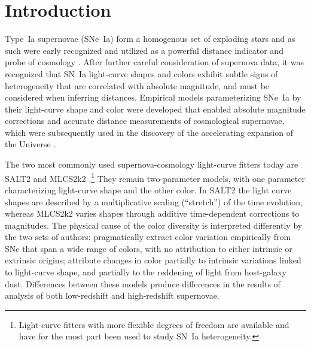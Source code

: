 \documentclass{aastex61}   	%
\begin{document}

\section{Introduction}
Type~Ia supernovae (SNe~Ia) form a homogenous set of exploding stars and as such were early recognized and utilized as a powerful distance indicator 
and probe of cosmology \citep[e.g.][]{1992ARA&A..30..359B, 1993ApJ...415....1S}.  After further careful consideration of supernova data, it was recognized
that SN~Ia light-curve shapes \citep{1993ApJ...413L.105P} and colors \citep{1996ApJ...473...88R, 1998A&A...331..815T} exhibit subtle signs of heterogeneity
that are correlated with absolute magnitude, and must be considered when inferring distances.  Empirical models parameterizing SNe~Ia by their light-curve shape \citep{1996ApJ...473...88R,
1997ApJ...483..565P,
1999ApJ...517..565P}
and color  \citep{1996ApJ...473...88R}  were developed that enabled absolute magnitude corrections
and accurate distance measurements of cosmological supernovae,
which 
were subsequently used in the discovery of the accelerating expansion of the Universe \citep{1998AJ....116.1009R,1999ApJ...517..565P}.

The two most commonly used supernova-cosmology light-curve fitters today are SALT2 \citep{2007A&A...466...11G} and MLCS2k2
\citep{2007ApJ...659..122J}.\footnote{Light-curve fitters with more flexible degrees of freedom
\citep[e.g.][]{2008ApJ...681..482C, 2011AJ....141...19B, 2011ApJ...731..120M} are available and have for
the most part been used to study SN~Ia heterogeneity.}
They remain two-parameter models, with one parameter characterizing light-curve shape and the other
 color.
In SALT2 the light curve shapes are described by a multiplicative scaling (``stretch'')  of the time evolution,
 whereas MLCS2k2 varies shapes through additive time-dependent corrections to magnitudes.
The physical cause of the color diversity is interpreted differently by the two sets of authors: 
\citet{2007A&A...466...11G} pragmatically extract color variation empirically from SNe that span a wide range of colors, with no attribution
to either intrinsic or extrinsic origins;
\citet{2007ApJ...659..122J}
attribute changes in color
partially to intrinsic variations linked to light-curve shape, and partially
to the reddening of light from host-galaxy dust.  Differences between these models produce differences in the results of
analysis of both low-redshift \citep{2007ApJ...664L..13C} and high-redshift \citep{2009ApJS..185...32K} supernovae.
\end{document}
